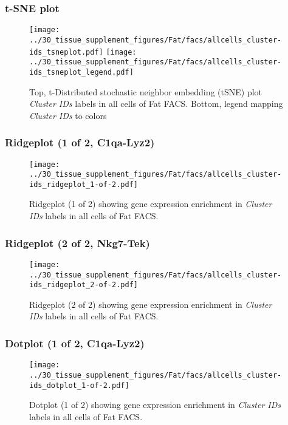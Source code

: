\clearpage
\subsubsection{t-SNE plot}
\begin{figure}[h]
\centering
\texttt{[image: ../30\_tissue\_supplement\_figures/Fat/facs/allcells\_cluster-ids\_tsneplot.pdf]}
\texttt{[image: ../30\_tissue\_supplement\_figures/Fat/facs/allcells\_cluster-ids\_tsneplot\_legend.pdf]}
\caption{Top, t-Distributed stochastic neighbor embedding (tSNE) plot  \emph{Cluster IDs} labels in all cells of Fat FACS. Bottom, legend mapping \emph{Cluster IDs} to colors}
\end{figure}


\clearpage

\subsubsection{Ridgeplot (1 of 2, C1qa-Lyz2)}
\begin{figure}[h]
\centering
\texttt{[image: ../30\_tissue\_supplement\_figures/Fat/facs/allcells\_cluster-ids\_ridgeplot\_1-of-2.pdf]}

\caption{ Ridgeplot (1 of 2)  showing gene expression enrichment in \emph{Cluster IDs} labels in all cells of Fat FACS. }
\end{figure}


\clearpage

\subsubsection{Ridgeplot (2 of 2, Nkg7-Tek)}
\begin{figure}[h]
\centering
\texttt{[image: ../30\_tissue\_supplement\_figures/Fat/facs/allcells\_cluster-ids\_ridgeplot\_2-of-2.pdf]}

\caption{ Ridgeplot (2 of 2)  showing gene expression enrichment in \emph{Cluster IDs} labels in all cells of Fat FACS. }
\end{figure}


\clearpage

\subsubsection{Dotplot (1 of 2, C1qa-Lyz2)}
\begin{figure}[h]
\centering
\texttt{[image: ../30\_tissue\_supplement\_figures/Fat/facs/allcells\_cluster-ids\_dotplot\_1-of-2.pdf]}

\caption{ Dotplot (1 of 2)  showing gene expression enrichment in \emph{Cluster IDs} labels in all cells of Fat FACS. }
\end{figure}


